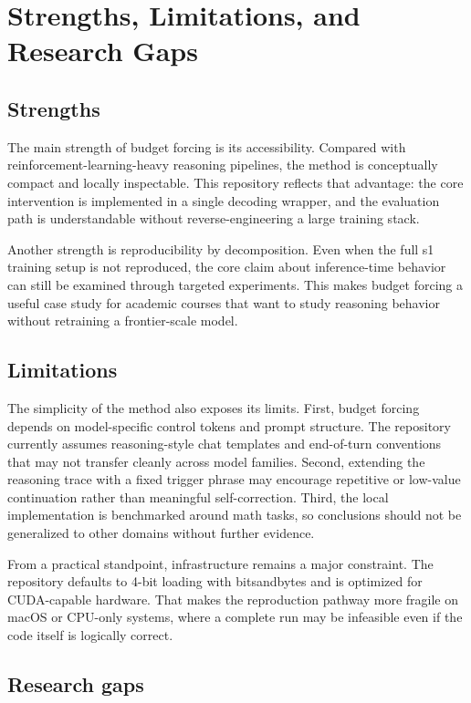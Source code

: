 \section{Strengths, Limitations, and Research Gaps}\label{sec:analysis}

\subsection{Strengths}

The main strength of budget forcing is its accessibility. Compared with reinforcement-learning-heavy reasoning pipelines, the method is conceptually compact and locally inspectable. This repository reflects that advantage: the core intervention is implemented in a single decoding wrapper, and the evaluation path is understandable without reverse-engineering a large training stack.

Another strength is reproducibility by decomposition. Even when the full s1 training setup is not reproduced, the core claim about inference-time behavior can still be examined through targeted experiments. This makes budget forcing a useful case study for academic courses that want to study reasoning behavior without retraining a frontier-scale model.

\subsection{Limitations}

The simplicity of the method also exposes its limits. First, budget forcing depends on model-specific control tokens and prompt structure. The repository currently assumes reasoning-style chat templates and end-of-turn conventions that may not transfer cleanly across model families. Second, extending the reasoning trace with a fixed trigger phrase may encourage repetitive or low-value continuation rather than meaningful self-correction. Third, the local implementation is benchmarked around math tasks, so conclusions should not be generalized to other domains without further evidence.

From a practical standpoint, infrastructure remains a major constraint. The repository defaults to 4-bit loading with bitsandbytes and is optimized for CUDA-capable hardware. That makes the reproduction pathway more fragile on macOS or CPU-only systems, where a complete run may be infeasible even if the code itself is logically correct.

\subsection{Research gaps}

